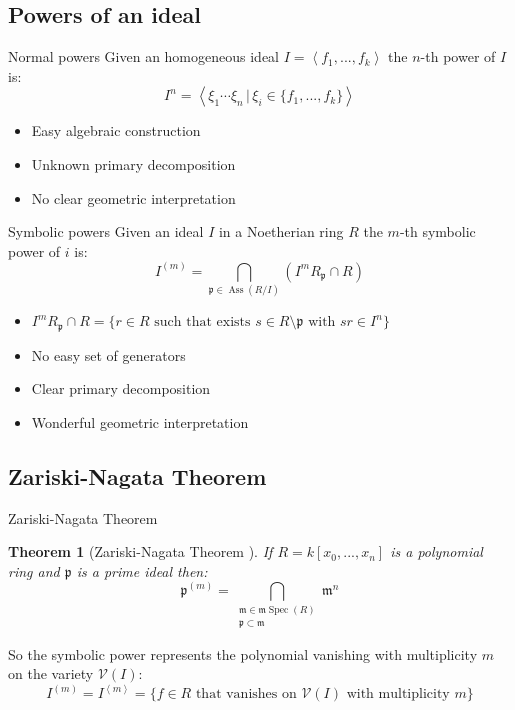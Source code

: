 \documentclass{beamer}
\theoremstyle{plain}
\newtheorem{teo}{Theorem}[section]
\theoremstyle{remark}
\theoremstyle{definition}
\newcommand{\p}{\mathfrak{p}}
\newcommand{\mm}{\mathfrak{m}}
\DeclareMathOperator{\Ass}{Ass}
\DeclareMathOperator{\Spec}{Spec}
\begin{document}
\subsection{Powers of an ideal}

\begin{frame}{Normal powers}
Given an homogeneous ideal $ I = \left\langle  f_1 , ... ,f_k \right\rangle  $ the $ n $-th power of $ I $ is: 
\[
 I^n = \left\langle \xi_1 \cdots \xi_n \,|\, \xi_i \in \{ f_1 , ... ,f_k \} \right\rangle 
\]
\pause
\begin{itemize}
\item Easy algebraic construction
\item Unknown primary decomposition %
\item No clear geometric interpretation 
\end{itemize}
\end{frame}

\begin{frame}{Symbolic powers}
Given an ideal $ I $ in a Noetherian ring $ R $ the $ m $-th symbolic power of $ i $ is:
\begin{equation*}\label{eq:sym_pow_def}
		I^{(m)} = \bigcap_{\p \in \Ass(R/I) } (I^m R_\p \cap R)
	\end{equation*}
\pause
\begin{itemize}
\item $ I^m R_\p \cap R = \{ r \in R \text{ such that exists } s \in R \setminus \p \text{ with } sr \in I^n\} $
\item No easy set of generators
\item Clear primary decomposition
\item Wonderful geometric interpretation
\end{itemize}
\end{frame}

\subsection{Zariski-Nagata Theorem}

\begin{frame}{Zariski-Nagata Theorem}
\begin{teo}[Zariski-Nagata Theorem \cite{Zar49, Nagata62}] \label{teo:zarnaga}
	If $ R = k[x_0 , ... , x_n] $ is a polynomial ring and $ \p $ is a prime ideal then:
	\begin{equation*}\label{eq:zar_nag_teo}
	\p^{(m)} = \bigcap_{\substack{ \mm \in \mm \Spec (R)\\ \p \subset \mm}} \mm ^n
	\end{equation*}
\end{teo}
\pause
So the symbolic power represents the polynomial vanishing with multiplicity $ m $ on the variety $ \mathcal{V}(I) $:
\begin{equation*}\label{eq:ideal_vanish}
	I^{(m)} = I^{\left<m\right>} = \{ f \in R \text{ that vanishes on } \mathcal{V}(I) \text{ with multiplicity } m\}
\end{equation*} 
\end{frame}
\end{document}
